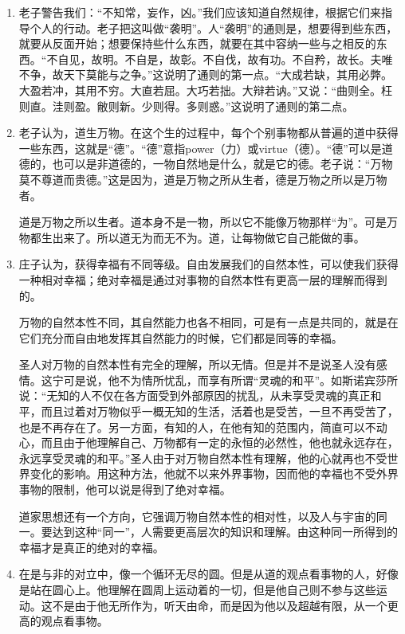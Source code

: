 \documentclass[UTF8]{ctexart}
\begin{document}
\begin{enumerate}
			\item 老子警告我们：“不知常，妄作，凶。”我们应该知道自然规律，根据它们来指导个人的行动。老子把这叫做“袭明”。人“袭明”的通则是，想要得到些东西，就要从反面开始；想要保持些什么东西，就要在其中容纳一些与之相反的东西。“不自见，故明。不自是，故彰。不自伐，故有功。不自矜，故长。夫唯不争，故天下莫能与之争。”这说明了通则的第一点。“大成若缺，其用必弊。大盈若冲，其用不穷。大直若屈。大巧若拙。大辩若讷。”又说：“曲则全。枉则直。洼则盈。敝则新。少则得。多则惑。”这说明了通则的第二点。
			
			\item 老子认为，道生万物。在这个生的过程中，每个个别事物都从普遍的道中获得一些东西，这就是“德”。“德”意指power（力）或virtue（德）。“德”可以是道德的，也可以是非道德的，一物自然地是什么，就是它的德。老子说：“万物莫不尊道而贵德。”这是因为，道是万物之所从生者，德是万物之所以是万物者。
			
			道是万物之所以生者。道本身不是一物，所以它不能像万物那样“为”。可是万物都生出来了。所以道无为而无不为。道，让每物做它自己能做的事。
			
			\item 庄子认为，获得幸福有不同等级。自由发展我们的自然本性，可以使我们获得一种相对幸福；绝对幸福是通过对事物的自然本性有更高一层的理解而得到的。
			
			万物的自然本性不同，其自然能力也各不相同，可是有一点是共同的，就是在它们充分而自由地发挥其自然能力的时候，它们都是同等的幸福。
			
		    圣人对万物的自然本性有完全的理解，所以无情。但是并不是说圣人没有感情。这宁可是说，他不为情所忧乱，而享有所谓“灵魂的和平”。如斯诺宾莎所说：“无知的人不仅在各方面受到外部原因的扰乱，从未享受灵魂的真正和平，而且过着对万物似乎一概无知的生活，活着也是受苦，一旦不再受苦了，也是不再存在了。另一方面，有知的人，在他有知的范围内，简直可以不动心，而且由于他理解自己、万物都有一定的永恒的必然性，他也就永远存在，永远享受灵魂的和平。”圣人由于对万物自然本性有理解，他的心就再也不受世界变化的影响。用这种方法，他就不以来外界事物，因而他的幸福也不受外界事物的限制，他可以说是得到了绝对幸福。
		
			道家思想还有一个方向，它强调万物自然本性的相对性，以及人与宇宙的同一。要达到这种“同一”，人需要更高层次的知识和理解。由这种同一所得到的幸福才是真正的绝对的幸福。
			
			\item 在是与非的对立中，像一个循环无尽的圆。但是从道的观点看事物的人，好像是站在圆心上。他理解在圆周上运动着的一切，但是他自己则不参与这些运动。这不是由于他无所作为，听天由命，而是因为他以及超越有限，从一个更高的观点看事物。
			

\end{enumerate}
\end{document}

